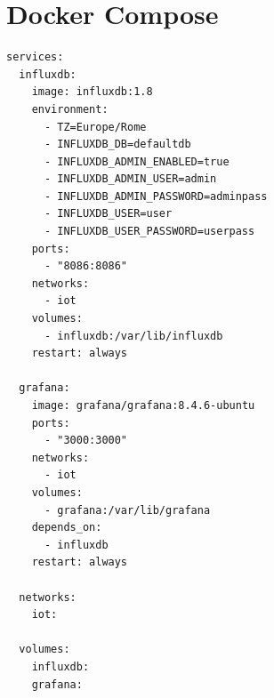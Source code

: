 \documentclass[italian,12pt,a4paper,oneside,final]{report}
\begin{document}
\section{Docker Compose}
\begin{lstlisting}[caption=docker-compose.yaml]
services:
  influxdb:
    image: influxdb:1.8
    environment:
      - TZ=Europe/Rome
      - INFLUXDB_DB=defaultdb
      - INFLUXDB_ADMIN_ENABLED=true
      - INFLUXDB_ADMIN_USER=admin
      - INFLUXDB_ADMIN_PASSWORD=adminpass
      - INFLUXDB_USER=user
      - INFLUXDB_USER_PASSWORD=userpass
    ports:
      - "8086:8086"
    networks:
      - iot
    volumes:
      - influxdb:/var/lib/influxdb
    restart: always

  grafana:
    image: grafana/grafana:8.4.6-ubuntu
    ports:
      - "3000:3000"
    networks:
      - iot
    volumes:
      - grafana:/var/lib/grafana
    depends_on:
      - influxdb
    restart: always

  networks:
    iot:

  volumes:
    influxdb:
    grafana:
\end{lstlisting}
\end{document}
